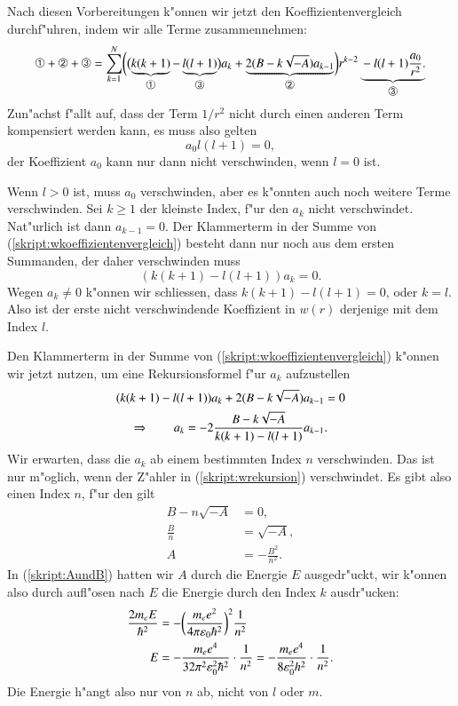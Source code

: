 Nach diesen Vorbereitungen k"onnen wir jetzt den Koeffizientenvergleich
durchf"uhren, indem wir alle Terme zusammennehmen:
\begin{equation}
\text{\ding{192}}
+
\text{\ding{193}}
+
\text{\ding{194}}
=
\sum_{k=1}^{N}
\biggl(
\bigl(
\underbrace{
k(k+1)
}_{\text{\normalsize\ding{192}}}
-\underbrace{
l(l+1)
}_{\text{\normalsize\ding{194}}}
\bigr)a_k
+
\underbrace{
2(B-k\sqrt{-A})a_{k-1}
}_{\text{\normalsize\ding{193}}}
\biggr)r^{k-2}
\underbrace{
\mathstrut
-l(l+1)\frac{a_0}{r^2}.
}_{\text{\normalsize\ding{194}}}
\label{skript:wkoeffizientenvergleich}
\end{equation}
Zun"achst f"allt auf, dass der Term $1/r^2$ nicht durch einen anderen
Term kompensiert werden kann, es muss also gelten
\[
a_0l(l+1)=0,
\]
der Koeffizient $a_0$ kann nur dann nicht verschwinden, wenn $l=0$ ist.

Wenn $l>0$ ist, muss $a_0$ verschwinden, aber es k"onnten auch noch
weitere Terme verschwinden.
Sei $k\ge 1$ der kleinste Index, f"ur den $a_k$ nicht verschwindet.
Nat"urlich ist dann $a_{k-1}=0$.
Der Klammerterm in der Summe von (\ref{skript:wkoeffizientenvergleich})
besteht dann nur noch aus dem ersten Summanden, der daher verschwinden
muss
\[
(k(k+1)-l(l+1))a_k=0.
\]
Wegen $a_k\ne 0$ k"onnen wir schliessen, dass $k(k+1)-l(l+1)=0$,
oder $k=l$.
Also ist der erste nicht verschwindende
Koeffizient in $w(r)$ derjenige mit dem Index $l$.

Den Klammerterm in der Summe von (\ref{skript:wkoeffizientenvergleich})
k"onnen wir jetzt nutzen, um eine Rekursionsformel f"ur $a_k$
aufzustellen
\begin{gather}
(k(k+1)-l(l+1))a_k+2(B-k\sqrt{-A})a_{k-1} =0
\notag
\\
\Rightarrow\qquad
a_k=-2\frac{B-k\sqrt{-A}}{k(k+1)-l(l+1)} a_{k-1}.
\label{skript:wrekursion}
\end{gather}
Wir erwarten, dass die $a_k$ ab einem bestimmten Index $n$ verschwinden.
Das ist nur m"oglich, wenn der Z"ahler in (\ref{skript:wrekursion})
verschwindet. Es gibt also einen Index $n$, f"ur den gilt
\begin{align*}
B-n\sqrt{-A}&=0,
\\
\frac{B}{n}&=\sqrt{-A},
\\
A&=-\frac{B^2}{n^2}.
\end{align*}
In (\ref{skript:AundB}) hatten wir $A$ durch die Energie $E$ ausgedr"uckt,
wir k"onnen also durch aufl"osen nach $E$ die Energie durch den Index $k$
ausdr"ucken:
\begin{align}
\frac{2m_eE}{\hbar^2}
&=
-
\biggl(
\frac{m_ee^2}{4\pi\varepsilon_0\hbar^2}
\biggr)^2
\frac{1}{n^2}
\notag
\\
E&=-\frac{m_e e^4}{32\pi^2\varepsilon_0^2\hbar^2}\cdot\frac{1}{n^2}
=-\frac{m_ee^4}{8\varepsilon_0^2h^2}\cdot\frac{1}{n^2}.
\label{skript:henergy}
\end{align}
Die Energie h"angt also nur von $n$ ab, nicht von $l$ oder $m$.

